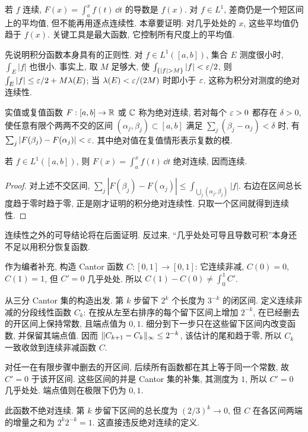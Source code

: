 \label{ra:c8}


若 $f$ 连续, $F(x)=\int_a^xf(t)\,\dd t$ 的导数是 $f(x)$. 对 $f\in L^1$, 差商仍是一个短区间上的平均值, 但不能再用逐点连续性. 本章要证明: 对几乎处处的 $x$, 这些平均值仍趋于 $f(x)$. 关键工具是最大函数, 它控制所有尺度上的平均值.

先说明积分函数本身具有的正则性. 对 $f\in L^1([a,b])$, 集合 $E$ 测度很小时, $\int_E|f|$ 也很小. 事实上, 取 $M$ 足够大, 使 $\int_{\{|f|>M\}}|f|<\eps/2$, 则
$\int_E|f|\le\varepsilon/2+M\lambda(E)$; 当 $\lambda(E)<\varepsilon/(2M)$ 时即小于 $\varepsilon$. 这称为积分对测度的绝对连续性.

\begin{definition}
实值或复值函数 $F:[a,b]\to\mathbb R$ 或 $\mathbb C$ 称为绝对连续, 若对每个 $\varepsilon>0$ 都存在 $\delta>0$, 使任意有限个两两不交的区间 $(\alpha_j,\beta_j)\subset[a,b]$ 满足 $\sum_j(\beta_j-\alpha_j)<\delta$ 时, 有 $\sum_j|F(\beta_j)-F(\alpha_j)|<\varepsilon$. 其中绝对值在复值情形表示复数的模.
\end{definition}

\begin{proposition}\label{ra:c8:primitive-ac}
若 $f\in L^1([a,b])$, 则 $F(x)=\int_a^xf(t)\,\dd t$ 绝对连续, 因而连续.
\end{proposition}
\begin{proof}
对上述不交区间, $\sum_j|F(\beta_j)-F(\alpha_j)|\le\int_{\bigcup_j(\alpha_j,\beta_j)}|f|$. 右边在区间总长度趋于零时趋于零, 正是刚才证明的积分绝对连续性. 只取一个区间就得到连续性.
\end{proof}

连续性之外的可导结论将在后面证明. 反过来, “几乎处处可导且导数可积”本身还不足以用积分恢复函数.

\begin{example}\label{ra:c8:cantor}
作为编者补充, 构造 Cantor 函数 $C:[0,1]\to[0,1]$: 它连续非减, $C(0)=0$, $C(1)=1$, 但 $C'=0$ 几乎处处. 所以 $C(1)-C(0)\ne\int_0^1C'$.
\end{example}
\begin{solution}
从三分 Cantor 集的构造出发. 第 $k$ 步留下 $2^k$ 个长度为 $3^{-k}$ 的闭区间. 定义连续非减的分段线性函数 $C_k$: 在按从左至右排序的每个留下区间上增加 $2^{-k}$, 在已经删去的开区间上保持常数, 且端点值为 $0,1$. 细分到下一步只在这些留下区间内改变函数, 并保留其端点值. 因而 $\lVert C_{k+1}-C_k\rVert_\infty\le2^{-k}$, 该估计的尾和趋于零, 所以 $C_k$ 一致收敛到连续非减函数 $C$.

对任一在有限步骤中删去的开区间, 后续所有函数都在其上等于同一个常数, 故 $C'=0$ 于该开区间. 这些区间的并是 Cantor 集的补集, 其测度为 $1$, 所以 $C'=0$ 几乎处处. 端点值则在极限下仍为 $0,1$.

此函数不绝对连续. 第 $k$ 步留下区间的总长度为 $(2/3)^k\to0$, 但 $C$ 在各区间两端的增量之和为 $2^k2^{-k}=1$. 这直接违反绝对连续的定义.
\end{solution}

